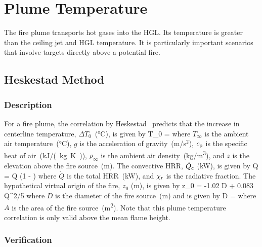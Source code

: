 
\chapter{Plume Temperature}
\label{Plume_Chapter}

The fire plume transports hot gases into the HGL. Its temperature is greater than the ceiling jet and HGL temperature. It is particularly important scenarios that involve targets directly above a potential fire.

\section{Heskestad Method}
\label{sec:Heskestad}

\subsection*{Description}

For a fire plume, the correlation by Heskestad~\cite{SFPE:Heskestad} predicts that the increase in centerline temperature, $\Delta T_0$~(\si{\celsius}), is given by
\be
\Delta T_0 = 
\label{eq:Heskestad}
\ee
where $T_\infty$ is the ambient air temperature~(\si{\celsius}), $g$ is the acceleration of gravity~(m/s$^2$), $c\sb{p}$ is the specific heat of air~(\si{kJ/(kg.K)}), $\rho_{\infty}$ is the ambient air density~(\si{kg/m^3}), and $z$ is the elevation above the fire source~(\si{m}). The convective HRR, $\dot Q\sb{c}$ (\si{kW}), is given by
\be
\dot Q = \dot Q (1 - \chi{})
\label{eq:Heskestad_Qc}
\ee
where $\dot Q$ is the total HRR~(\si{kW}), and $\chi\sb{r}$ is the radiative fraction. The hypothetical virtual origin of the fire, $z_0$ (\si{m}), is given by
\be
z_0 = -1.02 D + 0.083 \dot Q^{2/5}
\label{eq:Heskestad_z0}
\ee
where $D$ is the diameter of the fire source~(\si{m}) and is given by
\be
D = 
\label{eq:Heskestad_D}
\ee
where $A$ is the area of the fire source~(\si{m^2}).
Note that this plume temperature correlation is only valid above the mean flame height.


\clearpage


\subsection*{Verification}

